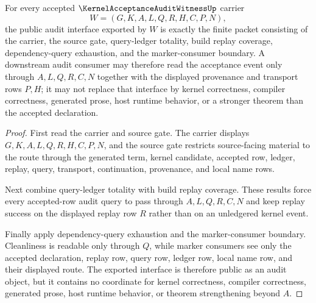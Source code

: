 \begin{theorem}
\label{thm:kernel-acceptance-audit-witness-public-export}
For every accepted $\KernelAcceptanceAuditWitnessUp$ carrier
$$
W=(G,K,A,L,Q,R,H,C,P,N),
$$
the public audit interface exported by $W$ is exactly the finite packet consisting of the carrier, the source gate, query-ledger totality, build replay coverage, dependency-query exhaustion, and the marker-consumer boundary. A downstream audit consumer may therefore read the acceptance event only through $A,L,Q,R,C,N$ together with the displayed provenance and transport rows $P,H$; it may not replace that interface by kernel correctness, compiler correctness, generated prose, host runtime behavior, or a stronger theorem than the accepted declaration.
\end{theorem}
\begin{proof}
First read the carrier and source gate. The carrier displays $G,K,A,L,Q,R,H,C,P,N$, and the source gate restricts source-facing material to the route through the generated term, kernel candidate, accepted row, ledger, replay, query, transport, continuation, provenance, and local name rows.

Next combine query-ledger totality with build replay coverage. These results force every accepted-row audit query to pass through $A,L,Q,R,C,N$ and keep replay success on the displayed replay row $R$ rather than on an unledgered kernel event.

Finally apply dependency-query exhaustion and the marker-consumer boundary. Cleanliness is readable only through $Q$, while marker consumers see only the accepted declaration, replay row, query row, ledger row, local name row, and their displayed route. The exported interface is therefore public as an audit object, but it contains no coordinate for kernel correctness, compiler correctness, generated prose, host runtime behavior, or theorem strengthening beyond $A$.
\end{proof}

